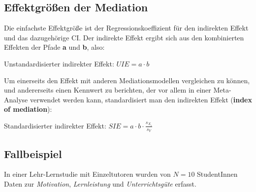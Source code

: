 \documentclass[]{article}
\begin{document}
\hypertarget{effektgroen-der-mediation}{%
\subsection*{Effektgrößen der Mediation}\label{effektgroen-der-mediation}}

Die einfachste Effektgröße ist der Regressionskoeffizient für den indirekten Effekt und das dazugehörige CI. Der indirekte Effekt ergibt sich aus den kombinierten Effekten der Pfade \textbf{a} und \textbf{b}, also:

Unstandardisierter indirekter Effekt: \(UIE = a \cdot b\)

Um einerseits den Effekt mit anderen Mediationsmodellen vergleichen zu können, und andererseits einen Kennwert zu berichten, der vor allem in einer Meta-Analyse verwendet werden kann, standardisiert man den indirekten Effekt (\textbf{index of mediation}):

Standardisierter indirekter Effekt: \(SIE = a \cdot b \cdot \frac{s_{X_i}}{s_{Y}}\)

\hypertarget{fallbeispiel}{%
\subsection*{Fallbeispiel}\label{fallbeispiel}}

In einer Lehr-Lernstudie mit Einzeltutoren wurden von \(N = 10\) StudentInnen Daten zur \emph{Motivation}, \emph{Lernleistung} und \emph{Unterrichtsgüte} erfasst.
\end{document}
